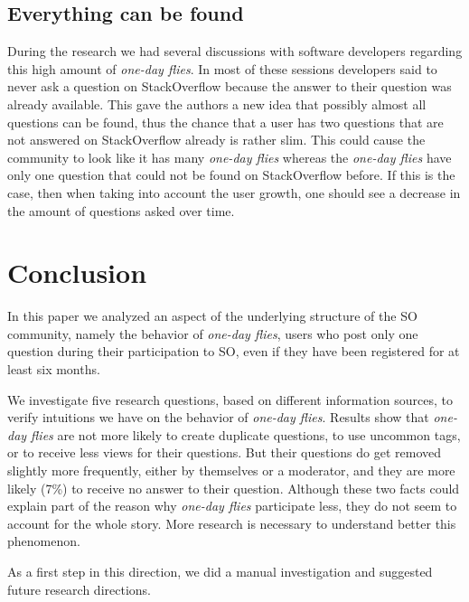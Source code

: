 \documentclass[conference]{IEEEtran}
\newcommand\odf{\emph{one-day flies}\xspace}
\begin{document}
\subsection{Everything can be found}
During the research we had several discussions with software developers
regarding this high amount of \odf. In most of these sessions
developers said to never ask a question on StackOverflow because the answer to
their question was already available. This gave the authors a new idea that
possibly almost all questions can be found, thus the chance that a user has two
questions that are not answered on StackOverflow already is rather slim. This
could cause the community to look like it has many \odf whereas the
\odf have only one question that could not be found on StackOverflow
before. If this is the case, then when taking into account the user growth, one
should see a decrease in the amount of questions asked over time. 

\section{Conclusion}

In this paper we analyzed an aspect of the underlying structure of the
SO community, namely the behavior of \odf, users who post only one question
during their participation to SO, even if they have been registered for at
least six months. 

We investigate five research questions, based on different information sources,
to verify intuitions we have on the behavior of \odf. Results show that \odf
are not more likely to create duplicate questions, to use uncommon tags, or to
receive less views for their questions. But their questions do get removed
slightly more frequently, either by themselves or a moderator, and they are
more likely (7\%) to receive no answer to their question. Although these two
facts could explain part of the reason why \odf participate less, they do not
seem to account for the whole story. More research is necessary to understand
better this phenomenon.

As a first step in this direction, we did a manual investigation and suggested
future research directions. 





\end{document}
